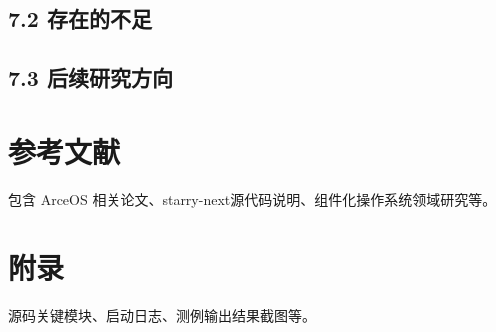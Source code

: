 \documentclass{article}
\begin{document}
\subsection{7.2 存在的不足}

\subsection{7.3 后续研究方向}

\section{参考文献}
包含 ArceOS 相关论文、starry-next源代码说明、组件化操作系统领域研究等。

\section{附录}
源码关键模块、启动日志、测例输出结果截图等。
\end{document}
